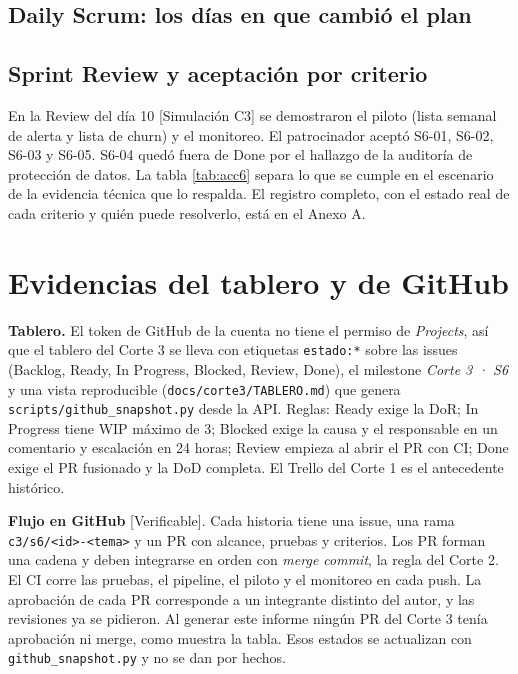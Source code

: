 \documentclass[10pt,a4paper]{article}
\newcommand{\rot}[1]{\textsf{\scriptsize\color{gris}[#1]}}
\begin{document}
\subsection{Daily Scrum: los días en que cambió el plan}


\subsection{Sprint Review y aceptación por criterio}
En la Review del día 10 \rot{Simulación C3} se demostraron el piloto (lista semanal de alerta y lista de churn) y el monitoreo. El patrocinador aceptó S6-01, S6-02, S6-03 y S6-05. S6-04 quedó fuera de Done por el hallazgo de la auditoría de protección de datos. La tabla \ref{tab:acc6} separa lo que se cumple en el escenario de la evidencia técnica que lo respalda. El registro completo, con el estado real de cada criterio y quién puede resolverlo, está en el Anexo A.

\begin{table}[h]
\caption{Aceptación de las historias de S6 por criterio}\label{tab:acc6}

\end{table}

\section{Evidencias del tablero y de GitHub}

\textbf{Tablero.} El token de GitHub de la cuenta no tiene el permiso de \emph{Projects}, así que el tablero del Corte 3 se lleva con etiquetas \texttt{estado:*} sobre las issues (Backlog, Ready, In Progress, Blocked, Review, Done), el milestone \emph{Corte 3 · S6} y una vista reproducible (\texttt{docs/corte3/TABLERO.md}) que genera \texttt{scripts/github\_snapshot.py} desde la API. Reglas: Ready exige la DoR; In Progress tiene WIP máximo de 3; Blocked exige la causa y el responsable en un comentario y escalación en 24 horas; Review empieza al abrir el PR con CI; Done exige el PR fusionado y la DoD completa. El Trello del Corte 1 es el antecedente histórico.

\textbf{Flujo en GitHub} \rot{Verificable}. Cada historia tiene una issue, una rama \texttt{c3/s6/<id>-<tema>} y un PR con alcance, pruebas y criterios. Los PR forman una cadena y deben integrarse en orden con \emph{merge commit}, la regla del Corte 2. El CI corre las pruebas, el pipeline, el piloto y el monitoreo en cada push. La aprobación de cada PR corresponde a un integrante distinto del autor, y las revisiones ya se pidieron. Al generar este informe ningún PR del Corte 3 tenía aprobación ni merge, como muestra la tabla. Esos estados se actualizan con \texttt{github\_snapshot.py} y no se dan por hechos.
\end{document}
